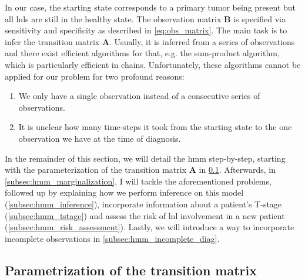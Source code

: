 \documentclass[../ms.tex]{subfiles}
\begin{document}
In our case, the starting state corresponds to a primary tumor being present but all \glspl{lnl} are still in the healthy state. The observation matrix $\mathbf{B}$ is specified via sensitivity and specificity as described in \cref{eq:obs_matrix}. The main task is to infer the transition matrix $\mathbf{A}$. Usually, it is inferred from a series of observations and there exist efficient algorithms for that, e.g. the sum-product algorithm, which is particularly efficient in chains. Unfortunately, these algorithms cannot be applied for our problem for two profound reasons:

\begin{enumerate}
    \item We only have a single observation instead of a consecutive series of observations. 
    \item It is unclear how many time-steps it took from the starting state to the one observation we have at the time of diagnosis.
\end{enumerate}

In the remainder of this section, we will detail the \gls{hmm} step-by-step, starting with the parameterization of the transition matrix $\mathbf{A}$ in \cref{subsec:hmm_parametrization}. Afterwards, in \cref{subsec:hmm_marginalization}, I will tackle the aforementioned problems, followed up by explaining how we perform inference on this model (\cref{subsec:hmm_inference}), incorporate information about a patient’s T-stage (\cref{subsec:hmm_tstage}) and assess the risk of \gls{lnl} involvement in a new patient (\cref{subsec:hmm_risk_assessment}). Lastly, we will introduce a way to incorporate incomplete observations in \cref{subsec:hmm_incomplete_diag}.

\subsection{Parametrization of the transition matrix}
\label{subsec:hmm_parametrization}
\end{document}
